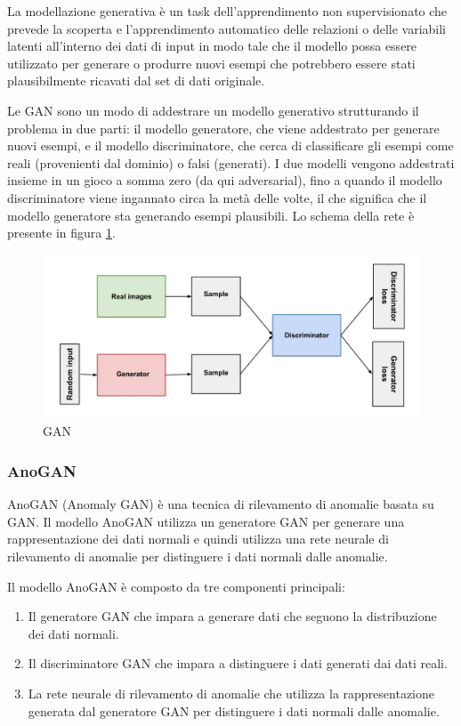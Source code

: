 La modellazione generativa è un task dell'apprendimento non supervisionato che prevede la scoperta e l'apprendimento automatico delle relazioni o delle variabili latenti all'interno dei dati di input in modo tale che il modello possa essere utilizzato per generare o produrre nuovi esempi che potrebbero essere stati plausibilmente ricavati dal set di dati originale.

Le GAN sono un modo di addestrare un modello generativo strutturando il problema in due parti: il modello generatore, che viene addestrato per generare nuovi esempi, e il modello discriminatore, che cerca di classificare gli esempi come reali (provenienti dal dominio) o falsi (generati). I due modelli vengono addestrati insieme in un gioco a somma zero (da qui adversarial), fino a quando il modello discriminatore viene ingannato circa la metà delle volte, il che significa che il modello generatore sta generando esempi plausibili. Lo schema della rete è presente in figura \ref{gan}.
\begin{figure}[t]
	\centering
	\includegraphics[width=12cm, scale=1]{images/gan}
	\caption{GAN}
	\label{gan}
\end{figure}

\subsubsection{AnoGAN}
AnoGAN (Anomaly GAN) è una tecnica di rilevamento di anomalie basata su GAN. Il modello AnoGAN utilizza un generatore GAN per generare una rappresentazione dei dati normali e quindi utilizza una rete neurale di rilevamento di anomalie per distinguere i dati normali dalle anomalie.

Il modello AnoGAN è composto da tre componenti principali:

\begin{enumerate}
\item Il generatore GAN che impara a generare dati che seguono la distribuzione dei dati normali.
\item Il discriminatore GAN che impara a distinguere i dati generati dai dati reali.
\item La rete neurale di rilevamento di anomalie che utilizza la rappresentazione generata dal generatore GAN per distinguere i dati normali dalle anomalie.
\end{enumerate}


